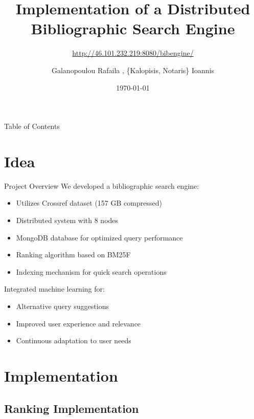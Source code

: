 \documentclass{beamer}
\begin{document}
\title{Implementation of a Distributed Bibliographic Search Engine}
\subtitle{\url{http://46.101.232.219:8080/bibengine/}} %
\author{Galanopoulou Rafaila ,
\{Kalopisis, 
 Notaris\}  Ioannis
 }
\date{\today}

\begin{frame}
\titlepage
\end{frame}

\begin{frame}{Table of Contents}
\end{frame}

\section{Idea}

\begin{frame}{Project Overview}
    We developed a bibliographic search engine:
    \begin{itemize}
    \item Utilizes Crossref dataset (157 GB compressed)
    \item Distributed system with 8 nodes
    \item MongoDB database for optimized query performance
    \item Ranking algorithm based on BM25F
    \item Indexing mechanism for quick search operations
    \end{itemize}
    Integrated machine learning for:
    \begin{itemize}
    \item Alternative query suggestions
    \item Improved user experience and relevance
    \item Continuous adaptation to user needs
    \end{itemize}
    \end{frame}
    
\section{Implementation}

\subsection{Ranking Implementation}
\end{document}
